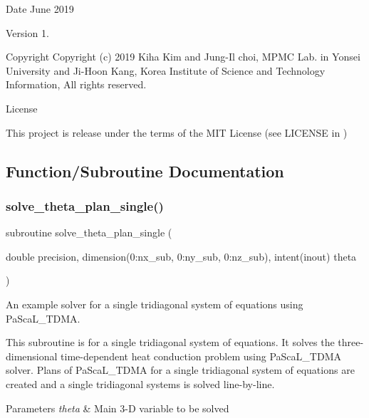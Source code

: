 \begin{DoxyDate}{Date}
June 2019 
\end{DoxyDate}
\begin{DoxyVersion}{Version}
1. 
\end{DoxyVersion}
\begin{DoxyParagraph}{Copyright}
Copyright (c) 2019 Kiha Kim and Jung-\/\+Il choi, M\+P\+MC Lab. in Yonsei University and Ji-\/\+Hoon Kang, Korea Institute of Science and Technology Information, All rights reserved. 
\end{DoxyParagraph}
\begin{DoxyParagraph}{License }

\end{DoxyParagraph}
This project is release under the terms of the M\+IT License (see L\+I\+C\+E\+N\+SE in ) 

\subsection{Function/\+Subroutine Documentation}
\mbox{\label{solve__theta__plan__single_8f90_a53ef6756822306f33a47be6a66232862}} 
\subsubsection{\texorpdfstring{solve\_theta\_plan\_single()}{solve\_theta\_plan\_single()}}
{\footnotesize\ttfamily subroutine solve\+\_\+theta\+\_\+plan\+\_\+single (\begin{DoxyParamCaption}\item[{double precision, dimension(0\+:nx\+\_\+sub, 0\+:ny\+\_\+sub, 0\+:nz\+\_\+sub), intent(inout)}]{theta }\end{DoxyParamCaption})}



An example solver for a single tridiagonal system of equations using Pa\+Sca\+L\+\_\+\+T\+D\+MA. 

This subroutine is for a single tridiagonal system of equations. It solves the three-\/dimensional time-\/dependent heat conduction problem using Pa\+Sca\+L\+\_\+\+T\+D\+MA solver. Plans of Pa\+Sca\+L\+\_\+\+T\+D\+MA for a single tridiagonal system of equations are created and a single tridiagonal systems is solved line-\/by-\/line. 
\begin{DoxyParams}{Parameters}
{\em theta} & Main 3-\/D variable to be solved \\
\hline
\end{DoxyParams}


